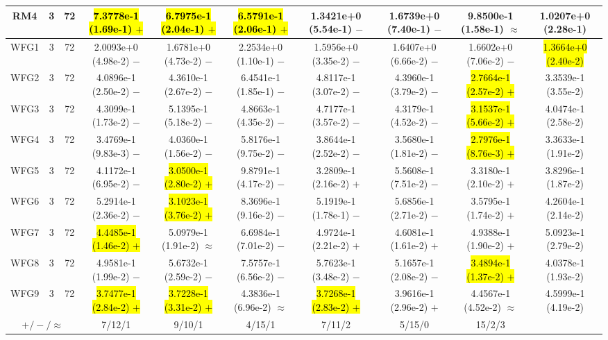 \documentclass[journal]{IEEEtran}
\begin{document}
\begin{table*}[htbp]
\begin{tabular}{cccccccccc}
\hline
\multirow{1}{*}{RM4}&3&72&\hl{7.3778e-1 (1.69e-1) $+$}&\hl{6.7975e-1 (2.04e-1) $+$}&\hl{6.5791e-1 (2.06e-1) $+$}&1.3421e+0 (5.54e-1) $-$&1.6739e+0 (7.40e-1) $-$&9.8500e-1 (1.58e-1) $\approx$&1.0207e+0 (2.28e-1)\\
\hline
\multirow{1}{*}{WFG1}&3&72&2.0093e+0 (4.98e-2) $-$&1.6781e+0 (4.73e-2) $-$&2.2534e+0 (1.10e-1) $-$&1.5956e+0 (3.35e-2) $-$&1.6407e+0 (6.66e-2) $-$&1.6602e+0 (7.06e-2) $-$&\hl{1.3664e+0 (2.40e-2)}\\
\hline
\multirow{1}{*}{WFG2}&3&72&4.0896e-1 (2.50e-2) $-$&4.3610e-1 (2.67e-2) $-$&6.4541e-1 (1.85e-1) $-$&4.8117e-1 (3.07e-2) $-$&4.3960e-1 (3.79e-2) $-$&\hl{2.7664e-1 (2.57e-2) $+$}&3.3539e-1 (3.55e-2)\\
\hline
\multirow{1}{*}{WFG3}&3&72&4.3099e-1 (1.73e-2) $-$&5.1395e-1 (5.18e-2) $-$&4.8663e-1 (4.35e-2) $-$&4.7177e-1 (3.57e-2) $-$&4.3179e-1 (4.52e-2) $-$&\hl{3.1537e-1 (5.66e-2) $+$}&4.0474e-1 (2.58e-2)\\
\hline
\multirow{1}{*}{WFG4}&3&72&3.4769e-1 (9.83e-3) $-$&4.0360e-1 (1.56e-2) $-$&5.8176e-1 (9.75e-2) $-$&3.8644e-1 (2.52e-2) $-$&3.5680e-1 (1.81e-2) $-$&\hl{2.7976e-1 (8.76e-3) $+$}&3.3633e-1 (1.91e-2)\\
\hline
\multirow{1}{*}{WFG5}&3&72&4.1172e-1 (6.95e-2) $-$&\hl{3.0500e-1 (2.80e-2) $+$}&9.8791e-1 (4.17e-2) $-$&3.2809e-1 (2.16e-2) $+$&5.5608e-1 (7.51e-2) $-$&3.3180e-1 (2.10e-2) $+$&3.8296e-1 (1.87e-2)\\
\hline
\multirow{1}{*}{WFG6}&3&72&5.2914e-1 (2.36e-2) $-$&\hl{3.1023e-1 (3.76e-2) $+$}&8.3696e-1 (9.16e-2) $-$&5.1919e-1 (1.78e-1) $-$&5.6856e-1 (2.71e-2) $-$&3.5795e-1 (1.74e-2) $+$&4.2604e-1 (2.14e-2)\\
\hline
\multirow{1}{*}{WFG7}&3&72&\hl{4.4485e-1 (1.46e-2) $+$}&5.0979e-1 (1.91e-2) $\approx$&6.6984e-1 (7.01e-2) $-$&4.9724e-1 (2.21e-2) $+$&4.6081e-1 (1.61e-2) $+$&4.9388e-1 (1.90e-2) $+$&5.0923e-1 (2.79e-2)\\
\hline
\multirow{1}{*}{WFG8}&3&72&4.9581e-1 (1.99e-2) $-$&5.6732e-1 (2.59e-2) $-$&7.5757e-1 (6.56e-2) $-$&5.7623e-1 (3.48e-2) $-$&5.1657e-1 (2.08e-2) $-$&\hl{3.4894e-1 (1.37e-2) $+$}&4.0378e-1 (1.93e-2)\\
\hline
\multirow{1}{*}{WFG9}&3&72&\hl{3.7477e-1 (2.84e-2) $+$}&\hl{3.7228e-1 (3.31e-2) $+$}&4.3836e-1 (6.96e-2) $\approx$&\hl{3.7268e-1 (2.83e-2) $+$}&3.9616e-1 (2.96e-2) $+$&4.4567e-1 (4.52e-2) $\approx$&4.5999e-1 (4.19e-2)\\
\hline
\multicolumn{3}{c}{$+/-/\approx$}&7/12/1&9/10/1&4/15/1&7/11/2&5/15/0&15/2/3&\\
\bottomrule
\end{tabular}
\label{No Label}
\end{table*}
\end{document}
